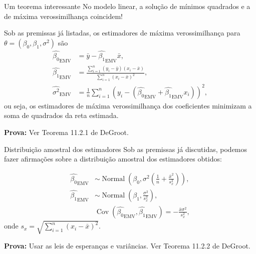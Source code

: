 \begin{frame}{Um teorema interessante}
No modelo linear, a solução de mínimos quadrados e a de máxima verossimilhança coincidem!
\begin{theo}
\label{thm:MLE_linreg_coefficients}
 Sob as premissas já listadas, os estimadores de máxima verossimilhança para $\theta = (\beta_0, \beta_1, \sigma^2)$ são
  \begin{align*}
  \hat{\beta_0}_{\text{EMV}} &= \bar{y} - \hat{\beta_1}_{\text{EMV}}\bar{x},\\
  \hat{\beta_1}_{\text{EMV}} &= \frac{\sum_{i=1}^n (y_i-\bar{y})(x_i-\bar{x})}{\sum_{i=1}^n \left(x_i - \bar{x}\right)^2},\\
  \hat{\sigma^2}_{\text{EMV}} & = \frac{1}{n} \sum_{i=1}^n \left(y_i - (  \hat{\beta_0}_{\text{EMV}} + \hat{\beta_1}_{\text{EMV}} x_i)\right)^2,  
 \end{align*}
 ou seja, os estimadores de máxima verossimilhança dos coeficientes minimizam a soma de quadrados da reta estimada.
\end{theo}
\textbf{Prova:} Ver Teorema 11.2.1 de DeGroot.
\end{frame}

\begin{frame}{Distribuição amostral dos estimadores}
Sob as premissas já discutidas, podemos fazer afirmações sobre a distribuição amostral dos estimadores obtidos:
\begin{theo}
\label{thm:sampling_distribution_linreg_coefficients}
   \begin{align*}
  \hat{\beta_0}_{\text{EMV}} &\sim \operatorname{Normal}\left(\beta_0, \sigma^2 \left( \frac{1}{n} + \frac{\bar{x}^2}{s_x^2} \right) \right),\\
  \hat{\beta_1}_{\text{EMV}}  &\sim \operatorname{Normal}\left(\beta_1, \frac{\sigma^2}{s_x^2}\right),\\
  &\operatorname{Cov}\left(\hat{\beta_0}_{\text{EMV}}, \hat{\beta_1}_{\text{EMV}} \right)  = -\frac{\bar{x}\sigma^2}{s_x^2},
 \end{align*}
 onde $s_x = \sqrt{\sum_{i=1}^n (x_i-\bar{x})^2}$.
\end{theo}
\textbf{Prova:} Usar as leis de esperanças e variâncias.
Ver Teorema 11.2.2 de DeGroot.
\end{frame}

